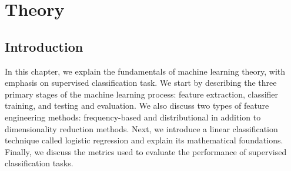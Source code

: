 
\chapter{Theory} %

\label{Chapter2} %


\section{Introduction} 

In this chapter, we explain the fundamentals of machine learning theory, with emphasis on supervised classification task. We start by describing the three primary stages of the machine learning process: feature extraction, classifier training, and testing and evaluation. We also discuss two types of feature engineering methods: frequency-based and distributional in addition to dimensionality reduction methods. Next, we introduce a linear classification technique called logistic regression and explain its mathematical foundations. Finally, we discuss the metrics used to evaluate the performance of supervised classification tasks.  

